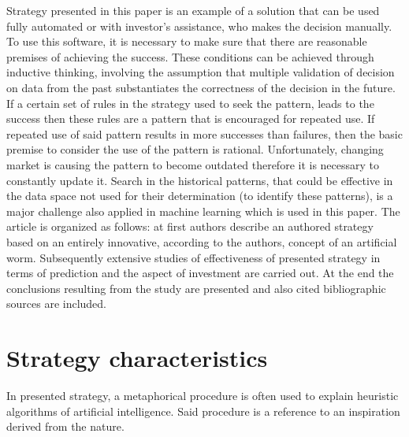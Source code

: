 \documentclass[runningheads,a4paper]{llncs}
\begin{document}
Strategy presented in this paper is an example of a solution that can be used fully automated or with investor’s assistance, who makes the decision manually. To use this software, it is necessary to make sure that there are reasonable premises of achieving the success. These conditions can be achieved through inductive thinking\cite{provost}\cite{KleskWilinski}, involving the assumption that multiple validation of decision on data from the past substantiates the correctness of the decision in the future. If a certain set of rules in the strategy used to seek the pattern, leads to the success then these rules are a pattern that is encouraged for repeated use. If repeated use of said pattern results in more successes than failures, then the basic premise to consider the use of the pattern is rational\cite{bishop2006pattern}\cite{KleskWilinski}. Unfortunately, changing market is causing the pattern to become outdated therefore it is necessary to constantly update it. Search in the historical patterns, that could be effective in the data space not used for their determination (to identify these patterns), is a major challenge also applied in machine learning which is used in this paper.
The article is organized as follows: at first authors describe an authored strategy based on an entirely innovative, according to the authors, concept of an artificial worm. Subsequently extensive studies of effectiveness of presented strategy in terms of prediction and the aspect of investment are carried out. At the end the conclusions resulting from the study are presented and also cited bibliographic sources are included.

\section{Strategy characteristics}
In presented strategy, a metaphorical procedure is often used to explain heuristic algorithms of artificial intelligence. Said procedure is a reference to an inspiration derived from the nature.\\
\end{document}
